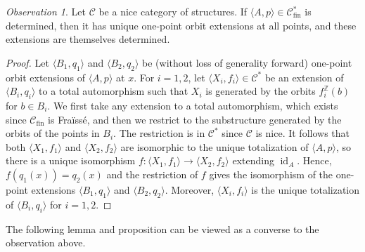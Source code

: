 \documentclass[10pt,a4paper]{article}
\theoremstyle{definition}
\theoremstyle{remark}
\newtheorem{observation}[tw]{Observation}
\newcommand \seq [1]{\langle #1 \rangle}
\newcommand \maps {\colon} %
\newcommand \id [1]{{\operatorname{id}_{#1}}}
\newcommand \Z {\mathbb{Z}}
\newcommand \C {\mathscr{C}}
\newcommand \fin {{\operatorname{fin}}}
\begin{document}
\begin{observation} \label{thm:determined_to_pointwise}
    Let $\C$ be a nice category of structures.
    If $\seq{A, p} \in \C^*_\fin$ is determined, then it has unique one-point orbit extensions at all points, and these extensions are themselves determined.
\end{observation}
\begin{proof}
    Let $\seq{B_1, q_1}$ and $\seq{B_2, q_2}$ be (without loss of generality forward) one-point orbit extensions of $\seq{A, p}$ at $x$.
    For $i = 1, 2$, let $\seq{X_i, f_i} \in \C^*$  be an extension of $\seq{B_i, q_i}$ to a total automorphism such that $X_i$ is generated by the orbits $f_i^\Z(b)$ for $b \in B_i$.
    We first take any extension to a total automorphism, which exists since $\C_\fin$ is Fraïssé, and then we restrict to the substructure generated by the orbits of the points in $B_i$.
    The restriction is in $\C^*$ since $\C$ is nice.
    It follows that both $\seq{X_1, f_1}$ and $\seq{X_2, f_2}$ are isomorphic to the unique totalization of $\seq{A, p}$, so there is a unique isomorphism $f\maps \seq{X_1, f_1} \to \seq{X_2, f_2}$ extending $\id{A}$.
    Hence, $f(q_1(x)) = q_2(x)$ and the restriction of $f$ gives the isomorphism of the one-point extensions $\seq{B_1, q_1}$ and $\seq{B_2, q_2}$.
    Moreover, $\seq{X_i, f_i}$ is the unique totalization of $\seq{B_i, q_i}$ for $i = 1, 2$.
\end{proof}

The following lemma and proposition can be viewed as a converse to the observation above.
\end{document}
